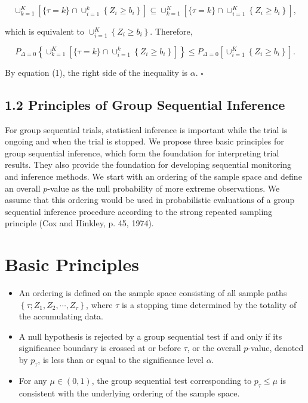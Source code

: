 \documentclass[10pt]{article}
\begin{document}
$$
\cup_{k=1}^{K}\left[\{\tau=k\} \cap \cup_{i=1}^{k}\left\{Z_{i} \geq b_{i}\right\}\right] \subseteq \cup_{k=1}^{K}\left[\{\tau=k\} \cap \cup_{i=1}^{K}\left\{Z_{i} \geq b_{i}\right\}\right],
$$

which is equivalent to $\cup_{i=1}^{K}\left\{Z_{i} \geq b_{i}\right\}$. Therefore,

$$
P_{\Delta=0}\left\{\cup_{k=1}^{K}\left[\{\tau=k\} \cap \cup_{i=1}^{k}\left\{Z_{i} \geq b_{i}\right\}\right]\right\} \leq P_{\Delta=0}\left[\cup_{i=1}^{K}\left\{Z_{i} \geq b_{i}\right\}\right] .
$$

By equation (1), the right side of the inequality is $\alpha$. \(\square\)

\subsection*{1.2 Principles of Group Sequential Inference}
For group sequential trials, statistical inference is important while the trial is ongoing and when the trial is stopped. We propose three basic principles for group sequential inference, which form the foundation for interpreting trial results. They also provide the foundation for developing sequential monitoring and inference methods. We start with an ordering of the sample space and define an overall $p$-value as the null probability of more extreme observations. We assume that this ordering would be used in probabilistic evaluations of a group sequential inference procedure according to the strong repeated sampling principle (Cox and Hinkley, p. 45, 1974).

\section*{Basic Principles}
\begin{itemize}
  \item[I.] An ordering is defined on the sample space consisting of all sample paths $\left\{\tau ; Z_{1}, Z_{2}, \cdots, Z_{\tau}\right\}$, where $\tau$ is a stopping time determined by the totality of the accumulating data.
  \item[II.] A null hypothesis is rejected by a group sequential test if and only if its significance boundary is crossed at or before $\tau$, or the overall $p$-value, denoted by $p_{\tau}$, is less than or equal to the significance level $\alpha$.
  \item[III.] For any $\mu \in(0,1)$, the group sequential test corresponding to $p_{\tau} \leq \mu$ is consistent with the underlying ordering of the sample space.
\end{itemize}
\end{document}
